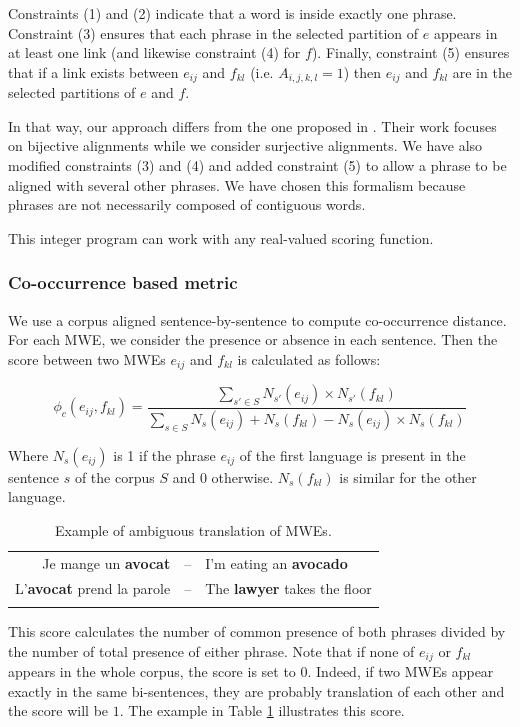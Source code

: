 \documentclass[output=paper,modfonts,nonflat]{langsci/langscibook}
\begin{document}
Constraints (1) and (2) indicate that a word is inside exactly one phrase. Constraint (3) ensures that each phrase in the selected partition of $e$ appears in at least one link (and likewise constraint (4) for $f$). Finally, constraint (5) ensures that if a link exists between $e_{ij}$ and $f_{kl}$ (i.e. $A_{i,j,k,l}=1$) then $e_{ij}$ and $f_{kl}$ are in the selected partitions of $e$ and $f$.

In that way, our approach differs from the one proposed in \citep{denero2008complexity}. 
Their work focuses on bijective alignments while we consider surjective alignments. 
We have also modified constraints (3) and (4) and added constraint (5) to allow a phrase to be aligned with several other phrases. 
We have chosen this formalism because phrases are not necessarily composed of contiguous words.

This integer program can work with any real-valued scoring function.

\subsubsection{Co-occurrence based metric}

We use a corpus aligned sentence-by-sentence to compute co-occurrence distance. For each MWE, we consider the presence or absence in each sentence. Then the score between two MWEs $e_{ij}$ and $f_{kl}$ is calculated as follows:

\begin{equation}
\phi_c(e_{ij},f_{kl})=\frac{\sum\limits_{s'\in S} N_{s'}(e_{ij}) \times N_{s'}(f_{kl})}{\sum\limits_{s\in S} N_{s}(e_{ij}) + N_{s}(f_{kl}) - N_{s}(e_{ij}) \times N_{s}(f_{kl})}
\end{equation}

Where $N_{s}(e_{ij})$ is 1 if the phrase $e_{ij}$ of the first language is present in the sentence $s$ of the corpus $S$ and $0$ otherwise. 
$N_{s}(f_{kl})$ is similar for the other language.

\begin{table}[h!]
\begin{tabular}{rcl}
  \lsptoprule
Je mange un \textbf{avocat} & -- & I'm eating an \textbf{avocado} \\
L'\textbf{avocat} prend la parole & -- & The \textbf{lawyer} takes the floor \\
  \lspbottomrule
\end{tabular}
\caption{\label{tab:probtrans} Example of ambiguous translation of MWEs.}
\end{table}
This score calculates the number of common presence of both phrases divided by the number of total presence of either phrase. 
Note that if none of $e_{ij}$ or $f_{kl}$ appears in the whole corpus, the score is set to $0$. 
Indeed, if two MWEs appear exactly in the same bi-sentences, they are probably translation of each other and the score will be $1$. 
The example in Table \ref{tab:probtrans} illustrates this score.
\end{document}
